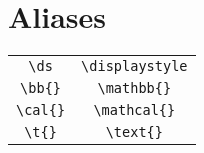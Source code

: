 \documentclass[french]{article}
\begin{document}
\section{Aliases}

\begin{tabular}{|c|c|}
    \hline
    \verb|\ds| & \verb|\displaystyle| \\
    \verb|\bb{}| & \verb|\mathbb{}| \\
    \verb|\cal{}| & \verb|\mathcal{}| \\
    \verb|\t{}| & \verb|\text{}| \\
    \hline
\end{tabular}
\end{document}
